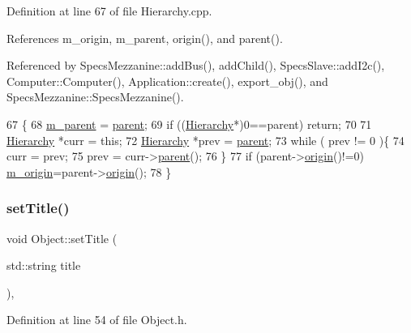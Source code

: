 Definition at line 67 of file Hierarchy.\+cpp.



References m\+\_\+origin, m\+\_\+parent, origin(), and parent().



Referenced by Specs\+Mezzanine\+::add\+Bus(), add\+Child(), Specs\+Slave\+::add\+I2c(), Computer\+::\+Computer(), Application\+::create(), export\+\_\+obj(), and Specs\+Mezzanine\+::\+Specs\+Mezzanine().


\begin{DoxyCode}
67                                               \{
68   \hyperlink{classHierarchy_a5814bb280d4e8539ab25ab6cbfb9cc4f}{m\_parent} = \hyperlink{classHierarchy_a1c7bec8257e717f9c1465e06ebf845fc}{parent};
69   \textcolor{keywordflow}{if} ((\hyperlink{classHierarchy}{Hierarchy}*)0==parent) \textcolor{keywordflow}{return};
70 
71   \hyperlink{classHierarchy}{Hierarchy} *curr = \textcolor{keyword}{this};
72   \hyperlink{classHierarchy}{Hierarchy} *prev = \hyperlink{classHierarchy_a1c7bec8257e717f9c1465e06ebf845fc}{parent};
73   \textcolor{keywordflow}{while} ( prev != 0 )\{
74     curr = prev;
75     prev = curr->\hyperlink{classHierarchy_a1c7bec8257e717f9c1465e06ebf845fc}{parent}();
76   \}
77   \textcolor{keywordflow}{if} (parent->\hyperlink{classHierarchy_aee461dc930ce3871636ff87f075b1b83}{origin}()!=0) \hyperlink{classHierarchy_a16c73e557d3a7c156ffb5dc4102d148e}{m\_origin}=parent->\hyperlink{classHierarchy_aee461dc930ce3871636ff87f075b1b83}{origin}();
78 \}
\end{DoxyCode}
\mbox{\label{classObject_a89557dbbad5bcaa02652f5d7fa35d20f}} 
\subsubsection{\texorpdfstring{set\+Title()}{setTitle()}}
{\footnotesize\ttfamily void Object\+::set\+Title (\begin{DoxyParamCaption}\item[{std\+::string}]{title }\end{DoxyParamCaption})\hspace{0.3cm}{\ttfamily [inline]}, {\ttfamily [inherited]}}



Definition at line 54 of file Object.\+h.




